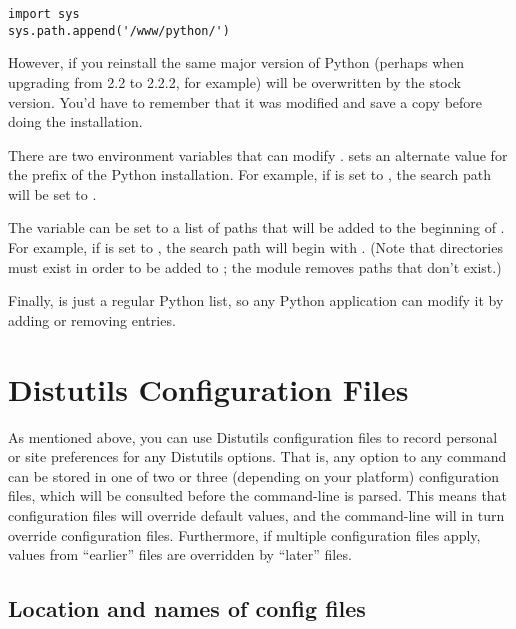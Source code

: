 \documentclass{howto}
\begin{document}
\begin{verbatim}
import sys
sys.path.append('/www/python/')
\end{verbatim}

However, if you reinstall the same major version of Python (perhaps
when upgrading from 2.2 to 2.2.2, for example)  will be
overwritten by the stock version.  You'd have to remember that it was
modified and save a copy before doing the installation.

There are two environment variables that can modify .
 sets an alternate value for the prefix of the
Python installation.  For example, if  is set to
, the search path will be set to .  

The  variable can be set to a list of paths that
will be added to the beginning of .  For example, if
 is set to , the search
path will begin with .  (Note that
directories must exist in order to be added to ; the
 module removes paths that don't exist.)

Finally,  is just a regular Python list, so any Python
application can modify it by adding or removing entries.


\section{Distutils Configuration Files}
\label{config-files}

As mentioned above, you can use Distutils configuration files to record
personal or site preferences for any Distutils options.  That is, any
option to any command can be stored in one of two or three (depending on
your platform) configuration files, which will be consulted before the
command-line is parsed.  This means that configuration files will
override default values, and the command-line will in turn override
configuration files.  Furthermore, if multiple configuration files
apply, values from ``earlier'' files are overridden by ``later'' files.


\subsection{Location and names of config files}
\label{config-filenames}
\end{document}
